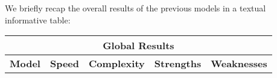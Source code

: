 We briefly recap the overall results of the previous models in a textual informative table:

\begin{center}
    \begin{adjustwidth}{-1.5cm}{}
        \begin{tabular}{|c|c|c|c|c|}
            \hline
            \multicolumn{5}{|c|}{\textbf{Global Results}} \\
            \hline
            \textbf{Model} & \textbf{Speed} & \textbf{Complexity} & \textbf{Strengths} & \textbf{Weaknesses} \\
            \hline
        \end{tabular}
    \end{adjustwidth}
\end{center}